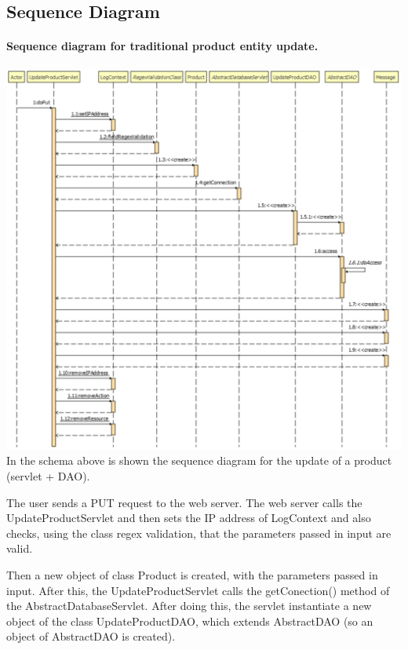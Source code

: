 \pagebreak
\subsection{Sequence Diagram}

\paragraph[]{Sequence diagram for traditional product entity update.} \hspace{1mm} \par
\includegraphics[width=\textwidth, keepaspectratio]{resources/updateproductsequence.pdf}
In the schema above is shown the sequence diagram for the update of a product (servlet + DAO). 

The user sends a PUT request to the web server. The web server calls the UpdateProductServlet and then sets the IP address of LogContext and also checks, using the class regex validation, that the parameters passed in input are valid.

Then a new object of class Product is created, with the parameters passed in input. After this, the UpdateProductServlet calls the getConection() method of the AbstractDatabaseServlet. After doing this, the servlet instantiate a new object of the class UpdateProductDAO, which extends AbstractDAO (so an object of AbstractDAO is created).

